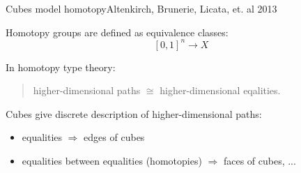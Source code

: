 \documentclass[english,draft]{beamer}
\begin{document}
\begin{frame}{Cubes model homotopy}{Altenkirch, Brunerie, Licata, et. al 2013}
 
Homotopy groups are defined as equivalence classes:
$$[0,1]^n \rightarrow X$$

In homotopy type theory:
\begin{quotation}
 higher-dimensional paths $\cong$ higher-dimensional eqalities.
\end{quotation}
\pause

Cubes give discrete description of higher-dimensional paths:
\begin{itemize}
 \item equalities $\Rightarrow$ edges of cubes
 \item equalities between equalities (homotopies) $\Rightarrow$ faces of cubes, ...
\end{itemize}

%  
\end{frame}
\end{document}
